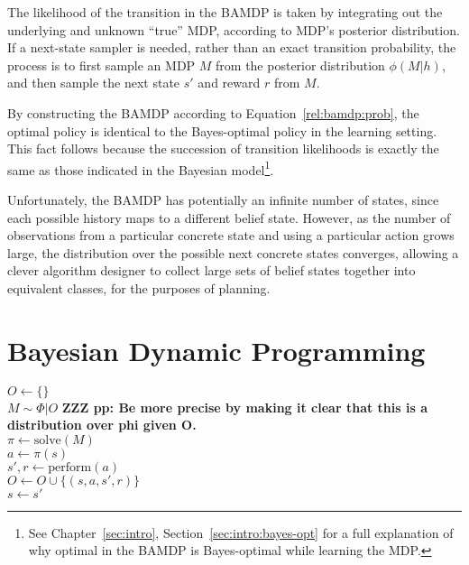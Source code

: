 The likelihood of the transition in the BAMDP is taken by integrating out the underlying and unknown ``true'' MDP, according to MDP's posterior distribution. If a next-state sampler is needed, rather than an exact transition probability, the process is to first sample an MDP $M$ from the posterior distribution $\phi(M|h)$, and then sample the next state $s'$ and reward $r$ from $M$.

By constructing the BAMDP according to Equation~\ref{rel:bamdp:prob}, the optimal policy is identical to the Bayes-optimal policy in the learning setting. This fact follows because the succession of transition likelihoods is exactly the same as those indicated in the Bayesian model\footnote{See Chapter~\ref{sec:intro}, Section~\ref{sec:intro:bayes-opt} for a full explanation of why optimal in the BAMDP is Bayes-optimal while learning the MDP.}. 

Unfortunately, the BAMDP has potentially an infinite number of states, since each possible history maps to a different belief state. However, as the number of observations from a particular concrete state and using a particular action grows large, the distribution over the possible next concrete states converges, allowing a clever algorithm designer to collect large sets of belief states together into equivalent classes, for the purposes of planning.  



\section{Bayesian Dynamic Programming}

\begin{algorithm}[tb]
	\caption{$\mbox{Bayesian~DP}(s, \Phi, K)$}
	\label{alg:bdp}
	$O \leftarrow \{\}$\\
	 {
		$M \sim \Phi|O$ \bf{ZZZ} pp: Be more precise by making it clear that this is a distribution over phi given O.\\
		$\pi \leftarrow \mbox{solve}(M)$\\
		 {
			$a \leftarrow \pi(s)$\\
			$s', r \leftarrow \mbox{perform}(a)$\\
			$O \leftarrow O \cup \{(s, a, s', r)\} $\\
			$s \leftarrow s'$
		}
	}
\end{algorithm}

